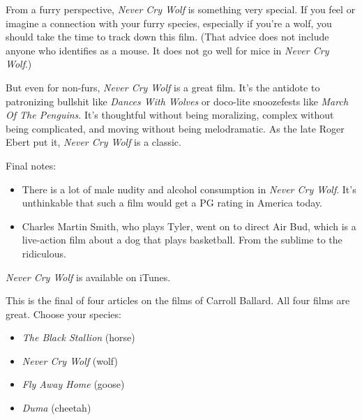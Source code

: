 From a furry perspective, \textit{Never Cry Wolf} is something very special. If you feel or imagine a connection with your furry species, especially if you’re a wolf, you should take the time to track down this film. (That advice does not include anyone who identifies as a mouse. It does not go well for mice in \textit{Never Cry Wolf}.)

But even for non-furs, \textit{Never Cry Wolf} is a great film. It’s the antidote to patronizing bullshit like \textit{Dances With Wolves} or doco-lite snoozefests like \textit{March Of The Penguins}. It’s thoughtful without being moralizing, complex without being complicated, and moving without being melodramatic. As the late Roger Ebert put it, \textit{Never Cry Wolf} is a classic.

Final notes:
\begin{itemize}
  \item There is a lot of male nudity and alcohol consumption in \textit{Never Cry Wolf}. It’s unthinkable that such a film would get a PG rating in America today.
  \item Charles Martin Smith, who plays Tyler, went on to direct Air Bud, which is a live-action film about a dog that plays basketball. From the sublime to the ridiculous.
\end{itemize}

\textit{Never Cry Wolf} is available on iTunes.

This is the final of four articles on the films of Carroll Ballard. All four films are great. Choose your species:

\begin{itemize}
  \item \textit{The Black Stallion} (horse)
  \item \textit{Never Cry Wolf} (wolf)
  \item \textit{Fly Away Home} (goose)
  \item \textit{Duma} (cheetah)
\end{itemize}
